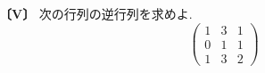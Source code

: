 \noindent\textbf{〔V〕}
次の行列の逆行列を求めよ.
\[
\begin{pmatrix}
1 & 3 & 1\\
0 & 1 & 1\\
1 & 3 & 2
\end{pmatrix}
\]

